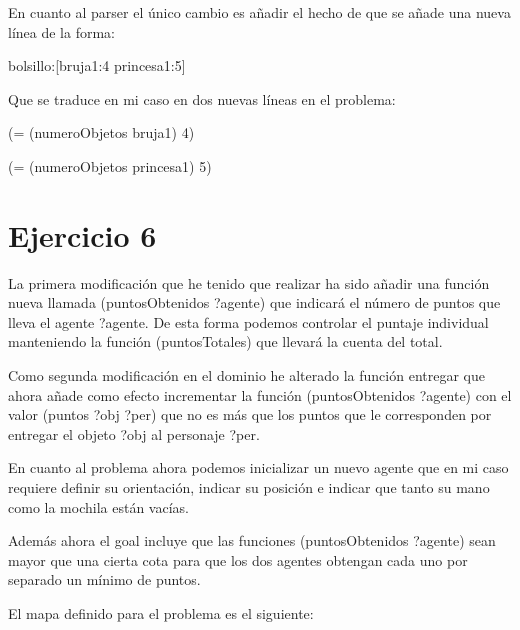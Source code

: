 \documentclass[12pt,a4paper]{article}
\begin{document}
En cuanto al parser el único cambio es añadir el hecho de que se añade una nueva línea de la forma:

bolsillo:[bruja1:4 princesa1:5]

Que se traduce en mi caso en dos nuevas líneas en el problema:

(= (numeroObjetos bruja1) 4)

(= (numeroObjetos princesa1) 5)

\section{Ejercicio 6}

La primera modificación que he tenido que realizar ha sido añadir una función nueva llamada (puntosObtenidos ?agente) que indicará el número de puntos que lleva el agente ?agente. De esta forma podemos controlar el puntaje individual manteniendo la función (puntosTotales) que llevará la cuenta del total.

Como segunda modificación en el dominio he alterado la función entregar que ahora añade como efecto incrementar la función (puntosObtenidos ?agente) con el valor (puntos ?obj ?per) que no es más que los puntos que le corresponden por entregar el objeto ?obj al personaje ?per.

En cuanto al problema ahora podemos inicializar un nuevo agente que en mi caso requiere definir su orientación, indicar su posición e indicar que tanto su mano como la mochila están vacías.

Además ahora el goal incluye que las funciones (puntosObtenidos ?agente) sean mayor que una cierta cota para que los dos agentes obtengan cada uno por separado un mínimo de puntos.

El mapa definido para el problema es el siguiente:



\end{document}
